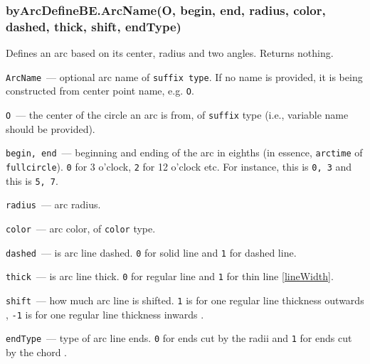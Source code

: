 \subsubsection{byArcDefineBE.ArcName(O, begin, end, radius, color, dashed, thick, shift, endType)}\label{byArcDefineBE}

	Defines an arc based on its center, radius and two angles. Returns nothing.

	
	\texttt{ArcName}~— optional arc name of \texttt{suffix type}. If no name is provided, it is being constructed from center point name, e.g. \texttt{O}.
	
	\texttt{O}~— the center of the circle an arc is from, of \texttt{suffix} type (i.e., variable name should be provided).
	
	\texttt{begin, end}~— beginning and ending of the arc in eighths (in essence, \texttt{arctime} of \texttt{fullcircle}). \texttt{0} for 3 o'clock, \texttt{2} for 12 o'clock etc. For instance, this
	is \texttt{0, 3} and this
	is \texttt{5, 7}.
	
	\texttt{radius}~— arc radius.
	
	\texttt{color}~— arc color, of \texttt{color} type.
	
	\texttt{dashed}~— is arc line dashed. \texttt{0} for solid line and \texttt{1} for dashed line.
	
	\texttt{thick}~— is arc line thick. \texttt{0} for regular line and \texttt{1} for thin line \ref{lineWidth}.
	
	\texttt{shift}~— how much arc line is shifted. \texttt{1} is for one regular line thickness outwards
	, \texttt{-1} is for one regular line thickness inwards
	.
	
	\texttt{endType}~— type of arc line ends. \texttt{0} for ends cut by the radii
	and \texttt{1} for ends cut by the chord
	.

